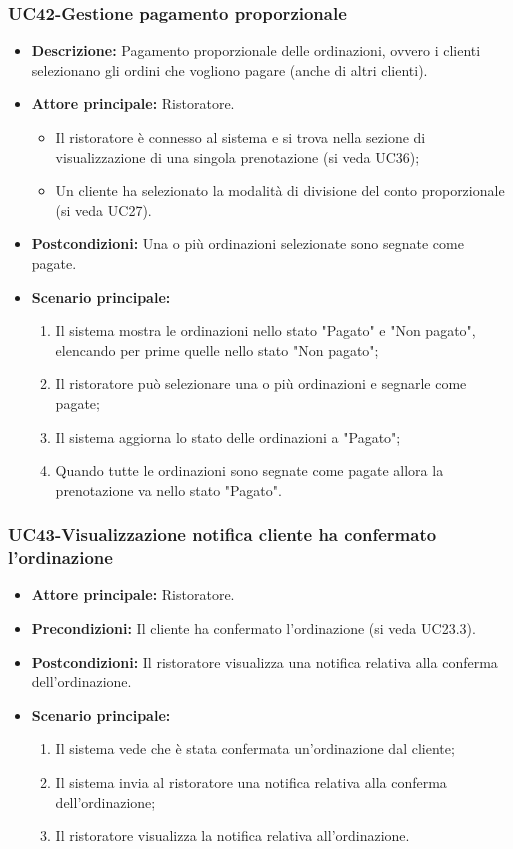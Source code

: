 \subsubsection{UC42-Gestione pagamento proporzionale}
\begin{itemize}
    \item \textbf{Descrizione:} Pagamento proporzionale delle ordinazioni, ovvero i clienti selezionano gli ordini che vogliono pagare (anche di altri clienti).
    \item \textbf{Attore principale:} Ristoratore.
    \begin{itemize}
        \item Il ristoratore è connesso al sistema e si trova nella sezione di visualizzazione di una singola prenotazione (si veda UC36);
        \item Un cliente ha selezionato la modalità di divisione del conto proporzionale (si veda UC27).
    \end{itemize}
    \item \textbf{Postcondizioni:} Una o più ordinazioni selezionate sono segnate come pagate.
    \item \textbf{Scenario principale:}
    \begin{enumerate}
        \item Il sistema mostra le ordinazioni nello stato "Pagato" e "Non pagato", elencando per prime quelle nello stato "Non pagato";
        \item Il ristoratore può selezionare una o più ordinazioni e segnarle come pagate;
        \item Il sistema aggiorna lo stato delle ordinazioni a "Pagato";
        \item Quando tutte le ordinazioni sono segnate come pagate allora la prenotazione va nello stato "Pagato".
    \end{enumerate}
\end{itemize}

\subsubsection{UC43-Visualizzazione notifica cliente ha confermato l'ordinazione}
\begin{itemize}
\item \textbf{Attore principale:} Ristoratore.
\item \textbf{Precondizioni:} Il cliente ha confermato l'ordinazione (si veda UC23.3).
\item \textbf{Postcondizioni:} Il ristoratore visualizza una notifica relativa alla conferma dell'ordinazione.
\item \textbf{Scenario principale:}
\begin{enumerate}
    \item Il sistema vede che è stata confermata un'ordinazione dal cliente;
    \item Il sistema invia al ristoratore una notifica relativa alla conferma dell'ordinazione;
    \item Il ristoratore visualizza la notifica relativa all'ordinazione.
\end{enumerate}
\end{itemize}

